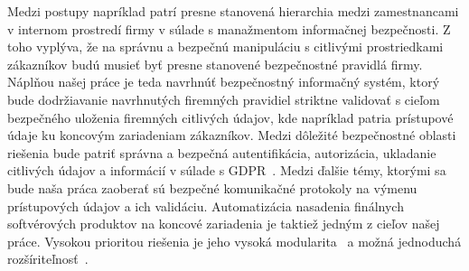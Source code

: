 Medzi postupy napríklad patrí presne stanovená hierarchia medzi zamestnancami v internom prostredí firmy v súlade s manažmentom informačnej bezpečnosti.
Z toho vyplýva, že na správnu a bezpečnú manipuláciu s citlivými prostriedkami zákazníkov budú musieť byť presne stanovené
bezpečnostné pravidlá firmy.
Náplňou našej práce je teda navrhnúť bezpečnostný informačný systém, ktorý bude dodržiavanie navrhnutých firemných
pravidiel striktne validovať s cieľom bezpečného uloženia firemných citlivých údajov, kde napríklad patria prístupové
údaje ku koncovým zariadeniam zákazníkov.
Medzi dôležité bezpečnostné oblasti riešenia bude patriť správna a bezpečná autentifikácia, autorizácia, ukladanie
citlivých údajov a informácií v súlade s GDPR~\cite{GDPR}.
Medzi ďalšie témy, ktorými sa bude naša práca zaoberať sú bezpečné komunikačné protokoly na výmenu prístupových údajov a ich validáciu.
Automatizácia nasadenia finálnych softvérových produktov na koncové zariadenia je taktiež jedným z cieľov našej práce.
Vysokou prioritou riešenia je jeho vysoká modularita~\cite{Modularity} a možná jednoduchá rozšíriteľnosť~\cite{Scalability}.

